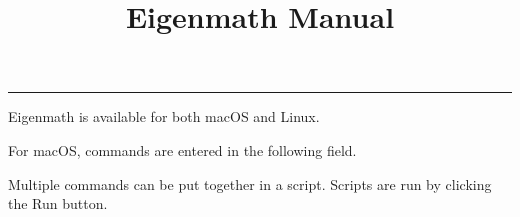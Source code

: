 \documentclass[12pt]{article}
\title{Eigenmath Manual}
\author{}
\begin{document}
\maketitle
\tableofcontents

\bigskip
\hrule
\bigskip

Eigenmath is available for both macOS and Linux.

\bigskip

For macOS, commands are entered in the following field.

\begin{center}
\end{center}

\noindent
Multiple commands can be put together in a script.
Scripts are run by clicking the Run button.

\begin{center}
\end{center}
\end{document}
